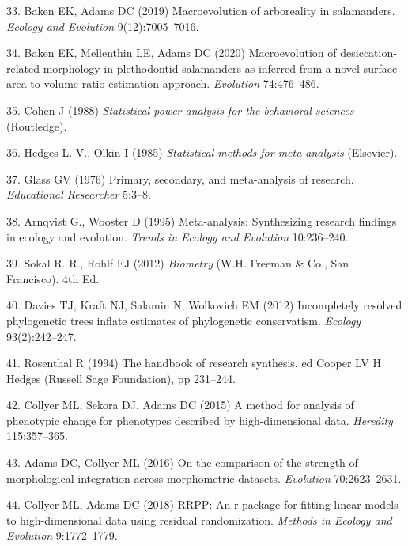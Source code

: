 \documentclass[9pt,twocolumn,twoside,lineno]{pnas-new}
\begin{document}
\leavevmode\hypertarget{ref-Baken2019}{}%
33. Baken EK, Adams DC (2019) Macroevolution of arboreality in
salamanders. \emph{Ecology and Evolution} 9(12):7005--7016.

\leavevmode\hypertarget{ref-Baken2020}{}%
34. Baken EK, Mellenthin LE, Adams DC (2020) Macroevolution of
desiccation‐related morphology in plethodontid salamanders as inferred
from a novel surface area to volume ratio estimation approach.
\emph{Evolution} 74:476--486.

\leavevmode\hypertarget{ref-Cohen1988}{}%
35. Cohen J (1988) \emph{Statistical power analysis for the behavioral
sciences} (Routledge).

\leavevmode\hypertarget{ref-HedgesOlkin1985}{}%
36. Hedges L. V., Olkin I (1985) \emph{Statistical methods for
meta-analysis} (Elsevier).

\leavevmode\hypertarget{ref-Glass1976}{}%
37. Glass GV (1976) Primary, secondary, and meta-analysis of research.
\emph{Educational Researcher} 5:3--8.

\leavevmode\hypertarget{ref-Arnqvist1995}{}%
38. Arnqvist G., Wooster D (1995) Meta-analysis: Synthesizing research
findings in ecology and evolution. \emph{Trends in Ecology and
Evolution} 10:236--240.

\leavevmode\hypertarget{ref-SokalRohlf2012}{}%
39. Sokal R. R., Rohlf FJ (2012) \emph{Biometry} (W.H. Freeman \& Co.,
San Francisco). 4th Ed.

\leavevmode\hypertarget{ref-Davies2012}{}%
40. Davies TJ, Kraft NJ, Salamin N, Wolkovich EM (2012) Incompletely
resolved phylogenetic trees inflate estimates of phylogenetic
conservatism. \emph{Ecology} 93(2):242--247.

\leavevmode\hypertarget{ref-Rosenthal1994}{}%
41. Rosenthal R (1994) The handbook of research synthesis. ed Cooper LV
H Hedges (Russell Sage Foundation), pp 231--244.

\leavevmode\hypertarget{ref-Collyer_et_al2015a}{}%
42. Collyer ML, Sekora DJ, Adams DC (2015) A method for analysis of
phenotypic change for phenotypes described by high-dimensional data.
\emph{Heredity} 115:357--365.

\leavevmode\hypertarget{ref-AdamsCollyer2016}{}%
43. Adams DC, Collyer ML (2016) On the comparison of the strength of
morphological integration across morphometric datasets. \emph{Evolution}
70:2623--2631.

\leavevmode\hypertarget{ref-CollyerAdams2018}{}%
44. Collyer ML, Adams DC (2018) RRPP: An r package for fitting linear
models to high-dimensional data using residual randomization.
\emph{Methods in Ecology and Evolution} 9:1772--1779.
\end{document}

